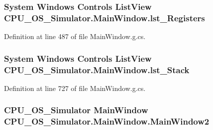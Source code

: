 \subsubsection[{lst\+\_\+\+Registers}]{\setlength{\rightskip}{0pt plus 5cm}System Windows Controls List\+View C\+P\+U\+\_\+\+O\+S\+\_\+\+Simulator.\+Main\+Window.\+lst\+\_\+\+Registers\hspace{0.3cm}{\ttfamily [package]}}\label{class_c_p_u___o_s___simulator_1_1_main_window_ae88013c536662328670f206a4cab99b1}


Definition at line 487 of file Main\+Window.\+g.\+cs.

\hypertarget{class_c_p_u___o_s___simulator_1_1_main_window_a8453db331c7cc1e7c1e711a06b2ec30c}{}
\subsubsection[{lst\+\_\+\+Stack}]{\setlength{\rightskip}{0pt plus 5cm}System Windows Controls List\+View C\+P\+U\+\_\+\+O\+S\+\_\+\+Simulator.\+Main\+Window.\+lst\+\_\+\+Stack\hspace{0.3cm}{\ttfamily [package]}}\label{class_c_p_u___o_s___simulator_1_1_main_window_a8453db331c7cc1e7c1e711a06b2ec30c}


Definition at line 727 of file Main\+Window.\+g.\+cs.

\hypertarget{class_c_p_u___o_s___simulator_1_1_main_window_adf996cda04d3cf426847b8fd8981ee66}{}
\subsubsection[{Main\+Window2}]{\setlength{\rightskip}{0pt plus 5cm}C\+P\+U\+\_\+\+O\+S\+\_\+\+Simulator {\bf Main\+Window} C\+P\+U\+\_\+\+O\+S\+\_\+\+Simulator.\+Main\+Window.\+Main\+Window2\hspace{0.3cm}{\ttfamily [package]}}\label{class_c_p_u___o_s___simulator_1_1_main_window_adf996cda04d3cf426847b8fd8981ee66}


